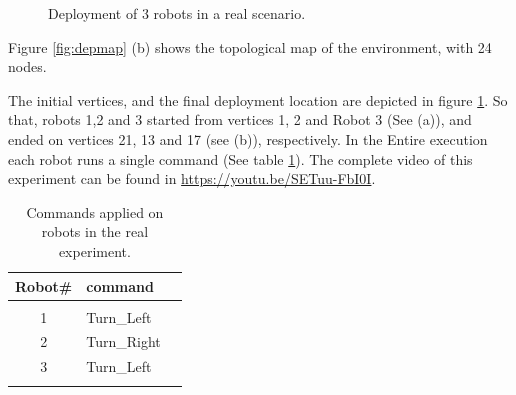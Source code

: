 \documentclass[twocolumn]{svjour3}       %
\begin{document}
\begin{figure}
\centering
{}
\caption{Deployment of 3 robots in a real scenario.}
\label{fig:depmapDeploy}
\end{figure}


Figure \ref{fig:depmap} (b) shows the topological map of the environment, with 24 nodes. 

The initial vertices, and the final deployment location are depicted in figure \ref{fig:depmapDeploy}. So that, robots 1,2 and 3 started from vertices 1, 2 and Robot 3 (See (a)), and ended on vertices 21, 13 and 17 (see (b)), respectively. In the Entire execution each robot runs a single command (See table \ref{tbl:commands}). The complete video of this experiment can be found in \href{https://youtu.be/SETuu-FbI0I}{https://youtu.be/SETuu-FbI0I}.

\begin{table}[t]
\centering
\caption{Commands applied on robots in the real experiment. }
\label{tbl:commands}
\begin{tabular}{cm{2cm}m{1.2cm}}
Robot\#    & command    \\
\hline\\
1   & Turn\_Left   \\
2 &  Turn\_Right \\
3 & Turn\_Left \\
\hline\\
\end{tabular}
\end{table}
\end{document}
